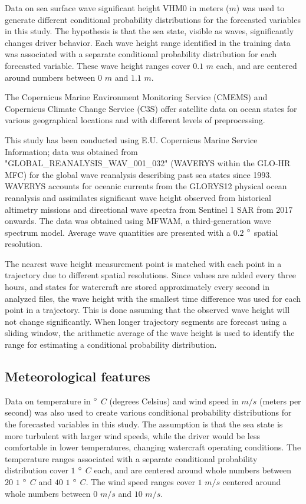 \documentclass[preprint,12pt]{elsarticle}
\begin{document}

Data on sea surface wave significant height VHM0 in meters ($m$) was used to generate different conditional probability distributions for the forecasted variables in this study. The hypothesis is that the sea state, visible as waves, significantly changes driver behavior. Each wave height range identified in the training data was associated with a separate conditional probability distribution for each forecasted variable. These wave height ranges cover $0.1$ $m$ each, and are centered around numbers between $0$ $m$ and $1.1$ $m$.

The Copernicus Marine Environment Monitoring Service (CMEMS) and Copernicus Climate Change Service (C3S) offer satellite data on ocean states for various geographical locations and with different levels of preprocessing.

This study has been conducted using E.U. Copernicus Marine Service Information; data was obtained from "GLOBAL\_REANALYSIS\_WAV\_001\_032" \cite{https://doi.org/10.48670/moi-00022} (WAVERYS within the GLO-HR MFC) for the global wave reanalysis describing past sea states since 1993. WAVERYS accounts for oceanic currents from the GLORYS12 physical ocean reanalysis and assimilates significant wave height observed from historical altimetry missions and directional wave spectra from Sentinel 1 SAR from 2017 onwards. The data was obtained using MFWAM, a third-generation wave spectrum model. Average wave quantities are presented with a $0.2$ $\degree$ spatial resolution.

The nearest wave height measurement point is matched with each point in a trajectory due to different spatial resolutions. Since values are added every three hours, and states for watercraft are stored approximately every second in analyzed files, the wave height with the smallest time difference was used for each point in a trajectory. This is done assuming that the observed wave height will not change significantly. When longer trajectory segments are forecast using a sliding window, the arithmetic average of the wave height is used to identify the range for estimating a conditional probability distribution.

\subsection{Meteorological features}

Data on temperature in $\degree$ $C$ (degrees Celsius) and wind speed in $m/s$ (meters per second) was also used to create various conditional probability distributions for the forecasted variables in this study. The assumption is that the sea state is more turbulent with larger wind speeds, while the driver would be less comfortable in lower temperatures, changing watercraft operating conditions. The temperature ranges associated with a separate conditional probability distribution cover $1$ $\degree$ $C$ each, and are centered around whole numbers between $20$ $1$ $\degree$ $C$ and $40$ $1$ $\degree$ $C$. The wind speed ranges cover $1$ $m/s$ centered around whole numbers between $0$ $m/s$ and $10$ $m/s$.
\end{document}
